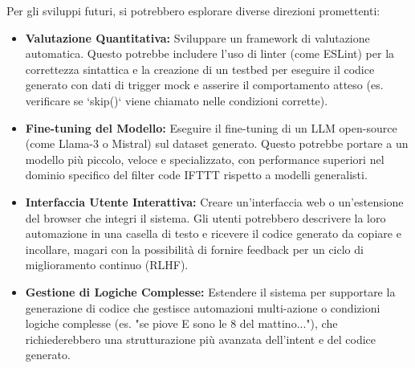 \documentclass[sigconf,natbib=false]{acmart}
\begin{document}
Per gli sviluppi futuri, si potrebbero esplorare diverse direzioni promettenti:
\begin{itemize}
    \item \textbf{Valutazione Quantitativa:} Sviluppare un framework di valutazione automatica. Questo potrebbe includere l'uso di linter (come ESLint) per la correttezza sintattica e la creazione di un testbed per eseguire il codice generato con dati di trigger mock e asserire il comportamento atteso (es. verificare se `skip()` viene chiamato nelle condizioni corrette).
    \item \textbf{Fine-tuning del Modello:} Eseguire il fine-tuning di un LLM open-source (come Llama-3 o Mistral) sul dataset generato. Questo potrebbe portare a un modello più piccolo, veloce e specializzato, con performance superiori nel dominio specifico del filter code IFTTT rispetto a modelli generalisti.
    \item \textbf{Interfaccia Utente Interattiva:} Creare un'interfaccia web o un'estensione del browser che integri il sistema. Gli utenti potrebbero descrivere la loro automazione in una casella di testo e ricevere il codice generato da copiare e incollare, magari con la possibilità di fornire feedback per un ciclo di miglioramento continuo (RLHF).
    \item \textbf{Gestione di Logiche Complesse:} Estendere il sistema per supportare la generazione di codice che gestisce automazioni multi-azione o condizioni logiche complesse (es. "se piove E sono le 8 del mattino..."), che richiederebbero una strutturazione più avanzata dell'intent e del codice generato.
\end{itemize}

\printbibliography %
\end{document}
